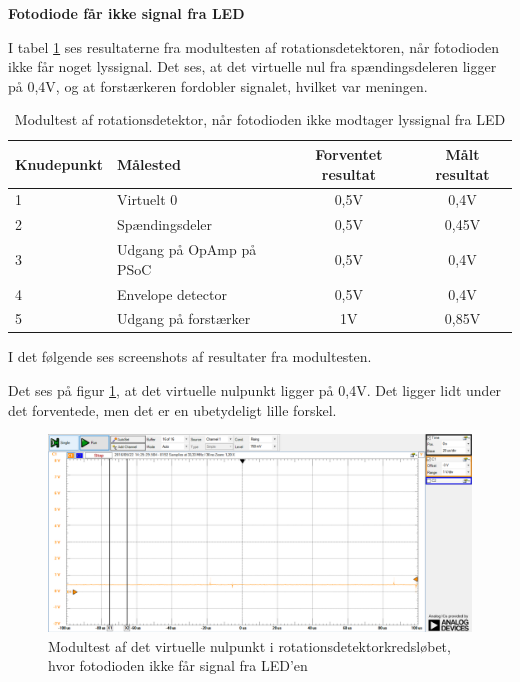 \noindent \textbf{Fotodiode får ikke signal fra LED}

\noindent I tabel \ref{dioderIkkeSe} ses resultaterne fra modultesten af rotationsdetektoren, når fotodioden ikke får noget lyssignal. Det ses, at det virtuelle nul fra spændingsdeleren ligger på 0,4V, og at forstærkeren fordobler signalet, hvilket var meningen. 

\begin{table}[H]
	\centering
	\begin{tabular}{|l|l|c|c|}
		\hline
		\textbf{Knudepunkt}		& \textbf{Målested}       & \textbf{Forventet resultat} & \textbf{Målt resultat} \\ \hline
		1						& Virtuelt 0              & 0,5V                        & 0,4V                   \\ \hline
		2						& Spændingsdeler          & 0,5V                        & 0,45V                  \\ \hline
		3						& Udgang på OpAmp på PSoC & 0,5V                        & 0,4V                   \\ \hline
		4 						& Envelope detector       & 0,5V                        & 0,4V                   \\ \hline
		5 						& Udgang på forstærker    & 1V                          & 0,85V                  \\ \hline
	\end{tabular}
	\caption{Modultest af rotationsdetektor, når fotodioden ikke modtager lyssignal fra LED}
	\label{dioderIkkeSe}
\end{table}

I det følgende ses screenshots af resultater fra modultesten. 

Det ses på figur \ref{fig:virt0IkkeSe}, at det virtuelle nulpunkt ligger på 0,4V. Det ligger lidt under det forventede, men det er en ubetydeligt lille forskel. 

\begin{figure}[H]
	\centering
	\includegraphics[width=\textwidth]{Test/images/AffyringTest/IkkeSe/virtuelt_nul}
	\caption{Modultest af det virtuelle nulpunkt i rotationsdetektorkredsløbet, hvor fotodioden ikke får signal fra LED'en}
	\label{fig:virt0IkkeSe}
\end{figure}

